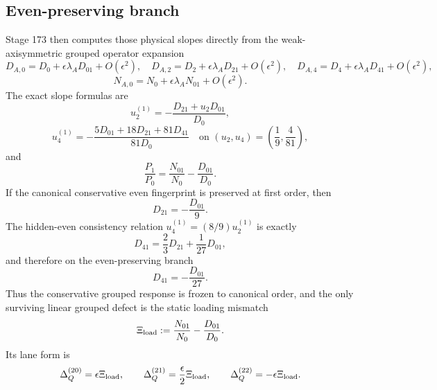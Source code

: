 \subsection{Even-preserving branch}
Stage 173 then computes those physical slopes directly from the weak-axisymmetric grouped operator expansion
\begin{equation}
\label{eq:part05-DN-expansion}
D_{A,0}=D_0+\epsilon\lambda_AD_{01}+O(\epsilon^2),
\quad
D_{A,2}=D_2+\epsilon\lambda_AD_{21}+O(\epsilon^2),
\quad
D_{A,4}=D_4+\epsilon\lambda_AD_{41}+O(\epsilon^2),
\end{equation}
\begin{equation}
\label{eq:part05-N-expansion}
N_{A,0}=N_0+\epsilon\lambda_AN_{01}+O(\epsilon^2).
\end{equation}
The exact slope formulas are
\begin{equation}
\label{eq:part05-physical-slopes-stage173}
u_2^{(1)}=-\frac{D_{21}+u_2D_{01}}{D_0},
\end{equation}
\begin{equation}
\label{eq:part05-u4-slope-stage173}
u_4^{(1)}
=-\frac{5D_{01}+18D_{21}+81D_{41}}{81D_0}
\quad
\text{on }(u_2,u_4)=\left(\frac19,\frac{4}{81}\right),
\end{equation}
and
\begin{equation}
\label{eq:part05-P1P0-stage173}
\frac{P_1}{P_0}
=
\frac{N_{01}}{N_0}-\frac{D_{01}}{D_0}.
\end{equation}
If the canonical conservative even fingerprint is preserved at first order, then
\begin{equation}
\label{eq:part05-even-preserving-D21}
D_{21}=-\frac{D_{01}}{9}.
\end{equation}
The hidden-even consistency relation \(u_4^{(1)}=(8/9)u_2^{(1)}\) is exactly
\begin{equation}
\label{eq:part05-hidden-even-D41-general}
D_{41}=\frac23D_{21}+\frac{1}{27}D_{01},
\end{equation}
and therefore on the even-preserving branch
\begin{equation}
\label{eq:part05-even-preserving-D41}
D_{41}=-\frac{D_{01}}{27}.
\end{equation}
Thus the conservative grouped response is frozen to canonical order, and the only surviving linear grouped defect is the static loading mismatch
\begin{equation}
\label{eq:part05-Xiload-def}
\Xi_{\rm load}
:=
\frac{N_{01}}{N_0}-\frac{D_{01}}{D_0}.
\end{equation}
Its lane form is
\begin{equation}
\label{eq:part05-Xiload-lanes}
\Delta_Q^{(20)}=\epsilon\Xi_{\rm load},
\qquad
\Delta_Q^{(21)}=\frac{\epsilon}{2}\Xi_{\rm load},
\qquad
\Delta_Q^{(22)}=-\epsilon\Xi_{\rm load}.
\end{equation}

